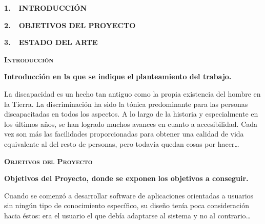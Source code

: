 \documentclass[a4paper]{article}
\begin{document}
\bigskip


\bigskip

{\bfseries\scshape
1.\ \ INTRODUCCIÓN}


\bigskip

{\scshape
{\textbf{2}}{\textbf{.\ \ OBJETIVOS DEL PROYECTO}}}


\bigskip

{\scshape
{\textbf{3}}{\textbf{.\ \ ESTADO DEL ARTE}}}
\listoffigures

\bigskip
\clearpage\setcounter{page}{1}\pagestyle{Convertirii}
{\raggedleft\bfseries\scshape
Introducción
\par}

\clearpage
\bigskip

\clearpage\setcounter{page}{1}\pagestyle{Convertiriii}

\bigskip


\bigskip


\bigskip


\bigskip

{
{\textbf{Introducción en la que se indique el}}{\textbf{ planteamiento del trabajo.}}}


\bigskip

{
{La discapacidad es un hecho tan antiguo como la propia existencia del hombre en la Tierra. La discriminación ha sido la tónica predominante para las personas discapacitadas en todos los aspectos. A lo largo de la historia y especialmente en los últimos años, se han logrado muchos avances en cuanto a accesibilidad. Cada vez son más las facilidades proporcionadas para obtener una calidad de vida equivalente al del resto de personas, pero }{todavía quedan cosas por hacer…}}

\clearpage\setcounter{page}{1}\pagestyle{Convertiriv}
{\raggedleft\bfseries\scshape
Objetivos del Proyecto
\par}

\clearpage
\bigskip

\clearpage\setcounter{page}{1}\pagestyle{Convertirv}

\bigskip


\bigskip


\bigskip


\bigskip

{
{\textbf{Objetivos del Proyecto, donde se exponen}}{\textbf{ los objetivos a conseguir.}}}


\bigskip

{
{Cuando se comenzó a desarrollar software }{de aplicaciones orientadas a usuarios sin ningún tipo de conocimiento específico, su diseño tenía poca consideración hacia éstos: era el usuario el que debía adaptarse al sistema y no al contrario…}}
\end{document}
